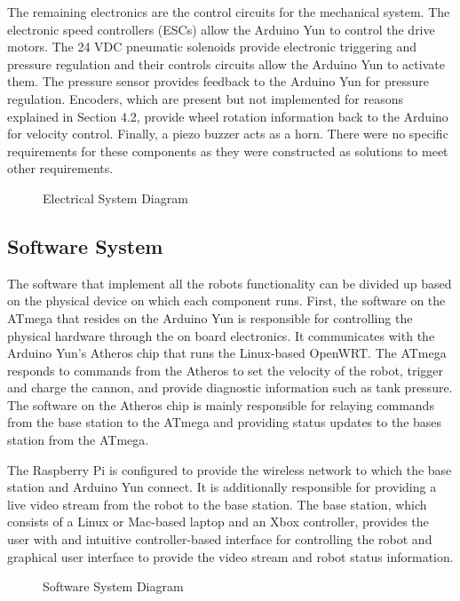 \documentclass[letterpaper,12pt]{article}
\begin{document}
The remaining electronics are the control circuits for the mechanical system.
The electronic speed controllers (ESCs) allow the Arduino Yun to control the
drive motors. The 24 VDC pneumatic solenoids provide electronic triggering and
pressure regulation and their controls circuits allow the Arduino Yun to
activate them. The pressure sensor provides feedback to the Arduino Yun for
pressure regulation.  Encoders, which are present but not implemented for
reasons explained in Section 4.2, provide wheel rotation information back to
the Arduino for velocity control. Finally, a piezo buzzer acts as a horn. There
were no specific requirements for these components as they were constructed as
solutions to meet other requirements.

\begin{figure}[h!]
  \centering
  
  \caption{Electrical System Diagram}
  \label{fig:e_system}
\end{figure}

\subsection{Software System}
The software that implement all the robots functionality can be divided up
based on the physical device on which each component runs. First, the software
on the ATmega that resides on the Arduino Yun is responsible for controlling
the physical hardware through the on board electronics. It communicates with
the Arduino Yun's Atheros chip that runs the Linux-based OpenWRT. The ATmega
responds to commands from the Atheros to set the velocity of the robot, trigger
and charge the cannon, and provide diagnostic information such as tank
pressure. The software on the Atheros chip is mainly responsible for relaying
commands from the base station to the ATmega and providing status updates to
the bases station from the ATmega.

The Raspberry Pi is configured to provide the wireless network to which the
base station and Arduino Yun connect. It is additionally responsible for
providing a live video stream from the robot to the base station. The base
station, which consists of a Linux or Mac-based laptop and an Xbox controller,
provides the user with and intuitive controller-based interface for controlling
the robot and graphical user interface to provide the video stream and robot
status information.

\begin{figure}[h!]
  \centering
  
  \caption{Software System Diagram}
  \label{fig:system_diagram}
\end{figure}
\end{document}
